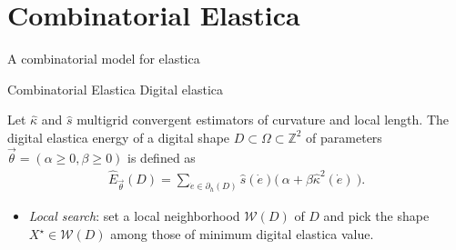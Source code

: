 \section{Combinatorial Elastica}

\begin{frame}
\begin{center}
\huge
A combinatorial model for elastica
\end{center}
\end{frame}

\begin{frame}
	{Combinatorial Elastica}	
	{Digital elastica}
%	
		\begin{definition}
		Let $\hat{\kappa}$ and $\hat{s}$ multigrid convergent estimators of curvature and local length. The digital elastica energy of a digital shape $D \subset \Omega \subset \mathbb{Z}^2$ of parameters $\vec{\theta} = (\alpha \geq 0, \beta \geq 0)$ is defined as
%		
		\begin{align*}
			\hat{E}_{\vec{\theta}}(D) = \sum_{\dot{e} \in \partial_h(D)}{\hat{s}(\dot{e}) \Big(\: \alpha + \beta \hat{\kappa}^2(\dot{e}) \: \Big). }
		\end{align*}
	\end{definition}
%	
	\begin{itemize}
		\item<2->{\emph{Local search}: set a local neighborhood $\mathcal{W}(D)$ of $D$ and pick the shape $X^{\star} \in \mathcal{W}(D)$ among those of minimum digital elastica value.}
	\end{itemize}
\end{frame}
%
%
%
%
% 
